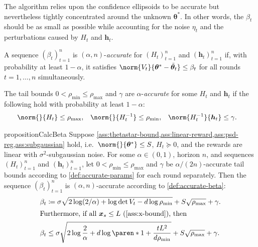 \documentclass{article}
\renewcommand{\vec}[1]{\bm{#1}}
\newcommand{\defeq}{\coloneq}
\newcommand{\inv}[1]{#1^{-1}}
\DeclarePairedDelimiter{\paren}()
\begin{document}
The algorithm relies upon the confidence ellipsoids to be accurate but
nevertheless tightly concentrated around the unknown $\vec\theta^*$.
In other words, the $\beta_t$ should be as small as possible while
accounting for the noise $\eta_t$ and the perturbations caused by
$H_t$ and $\vec h_t$.

\begin{definition}\label{def:accurate-beta}
  A sequence $(\beta_t)_{t=1}^n$ is $(\alpha, n)$-\emph{accurate} for
  $(H_t)_{t=1}^n$ and $(\vec h_t)_{t=1}^n$ if, with probability at
  least $1-\alpha$, it satisfies
  $\norm{V_t}{\vec\theta^* - \tilde{\vec\theta}_t} \le \beta_t$
  for all rounds $t=1,\dotsc,n$ simultaneously.
\end{definition}

\begin{definition}\label{def:accurate-params}
  The tail bounds $0 < \rho_{\min} \le \rho_{\max}$ and $\gamma$ are
  $\alpha$-\emph{accurate} for some $H_t$ and $\vec h_t$ if the
  following hold with probability at least $1-\alpha$:
  \begin{align*}
    \norm{}{H_t} &\le \rho_{\max},
    &\norm{}{\inv{H_t}} &\le \rho_{\min},
    &\norm{\inv{H_t}}{\vec h_t} &\le \gamma.
  \end{align*}
\end{definition}

\begin{restatable}{proposition}{CalcBeta}%
  \label{prop:calc-beta}
  Suppose
  \cref{ass:thetastar-bound,ass:linear-reward,ass:psd-reg,ass:subgaussian}
  hold, i.e.\ $\norm{}{\vec\theta^*} \le S$, $H_t \succeq 0$, and the
  rewards are linear with $\sigma^2$-subgaussian noise.  For some
  $\alpha\in(0,1)$, horizon $n$, and sequences $(H_t)_{t=1}^n$ and
  $(\vec h_t)_{t=1}^n$, let $0 < \rho_{\min} \le \rho_{\max}$ and
  $\gamma$ be $\alpha/(2n)$-accurate tail bounds according to
  \cref{def:accurate-params} for each round separately.  Then the
  sequence $(\beta_t)_{t=1}^n$ is $(\alpha,n)$-accurate according to
  \cref{def:accurate-beta}:
  \begin{align*}
    \beta_t &\defeq \sigma\sqrt{2\log(2/\alpha) + \log\det V_t - d\log\rho_{\min}}
             + S\sqrt{\rho_{\max}} + \gamma. \\
    \shortintertext{Furthermore, if all $\vec x_s \le L$
    (\cref{ass:x-bound}), then}
    \beta_t &\le \sigma\sqrt{2\log\frac{2}{\alpha} + d\log\paren*{1 + \frac{tL^2}{d\rho_{\min}}}}
             + S\sqrt{\rho_{\max}} + \gamma.
  \end{align*}
\end{restatable}
\end{document}
